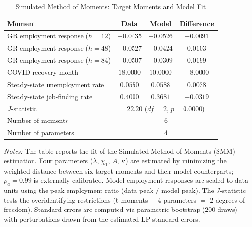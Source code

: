\begin{table}[H]
\centering
\caption{Simulated Method of Moments: Target Moments and Model Fit}
\begin{threeparttable}
\begin{tabular}{lccc}
\toprule
Moment & Data & Model & Difference \\
\midrule
GR employment response ($h=12$) & $-0.0435$ & $-0.0526$ & $-0.0091$ \\
GR employment response ($h=48$) & $-0.0527$ & $-0.0424$ & $0.0103$ \\
GR employment response ($h=84$) & $-0.0507$ & $-0.0309$ & $0.0199$ \\
COVID recovery month & $18.0000$ & $10.0000$ & $-8.0000$ \\
Steady-state unemployment rate & $0.0550$ & $0.0588$ & $0.0038$ \\
Steady-state job-finding rate & $0.4000$ & $0.3681$ & $-0.0319$ \\
\midrule
$J$-statistic & \multicolumn{3}{c}{$22.20$ ($df=2$, $p=0.0000$)} \\
Number of moments & \multicolumn{3}{c}{6} \\
Number of parameters & \multicolumn{3}{c}{4} \\
\bottomrule
\end{tabular}
\begin{tablenotes}[flushleft]
\small
\item \textit{Notes:} The table reports the fit of the Simulated Method of Moments (SMM) estimation. Four parameters ($\lambda$, $\chi_1$, $A$, $\kappa$) are estimated by minimizing the weighted distance between six target moments and their model counterparts; $\rho_a = 0.99$ is externally calibrated. Model employment responses are scaled to data units using the peak employment ratio (data peak / model peak). The $J$-statistic tests the overidentifying restrictions (6 moments $-$ 4 parameters $=$ 2 degrees of freedom). Standard errors are computed via parametric bootstrap (200 draws) with perturbations drawn from the estimated LP standard errors.
\end{tablenotes}
\end{threeparttable}
\label{tab:smm}
\end{table}
